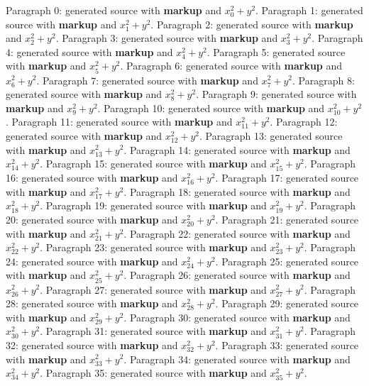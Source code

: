 \documentclass{article}
\begin{document}
Paragraph 0: generated source with \textbf{markup} and $x_{0}^2 + y^2$.
Paragraph 1: generated source with \textbf{markup} and $x_{1}^2 + y^2$.
Paragraph 2: generated source with \textbf{markup} and $x_{2}^2 + y^2$.
Paragraph 3: generated source with \textbf{markup} and $x_{3}^2 + y^2$.
Paragraph 4: generated source with \textbf{markup} and $x_{4}^2 + y^2$.
Paragraph 5: generated source with \textbf{markup} and $x_{5}^2 + y^2$.
Paragraph 6: generated source with \textbf{markup} and $x_{6}^2 + y^2$.
Paragraph 7: generated source with \textbf{markup} and $x_{7}^2 + y^2$.
Paragraph 8: generated source with \textbf{markup} and $x_{8}^2 + y^2$.
Paragraph 9: generated source with \textbf{markup} and $x_{9}^2 + y^2$.
Paragraph 10: generated source with \textbf{markup} and $x_{10}^2 + y^2$.
Paragraph 11: generated source with \textbf{markup} and $x_{11}^2 + y^2$.
Paragraph 12: generated source with \textbf{markup} and $x_{12}^2 + y^2$.
Paragraph 13: generated source with \textbf{markup} and $x_{13}^2 + y^2$.
Paragraph 14: generated source with \textbf{markup} and $x_{14}^2 + y^2$.
Paragraph 15: generated source with \textbf{markup} and $x_{15}^2 + y^2$.
Paragraph 16: generated source with \textbf{markup} and $x_{16}^2 + y^2$.
Paragraph 17: generated source with \textbf{markup} and $x_{17}^2 + y^2$.
Paragraph 18: generated source with \textbf{markup} and $x_{18}^2 + y^2$.
Paragraph 19: generated source with \textbf{markup} and $x_{19}^2 + y^2$.
Paragraph 20: generated source with \textbf{markup} and $x_{20}^2 + y^2$.
Paragraph 21: generated source with \textbf{markup} and $x_{21}^2 + y^2$.
Paragraph 22: generated source with \textbf{markup} and $x_{22}^2 + y^2$.
Paragraph 23: generated source with \textbf{markup} and $x_{23}^2 + y^2$.
Paragraph 24: generated source with \textbf{markup} and $x_{24}^2 + y^2$.
Paragraph 25: generated source with \textbf{markup} and $x_{25}^2 + y^2$.
Paragraph 26: generated source with \textbf{markup} and $x_{26}^2 + y^2$.
Paragraph 27: generated source with \textbf{markup} and $x_{27}^2 + y^2$.
Paragraph 28: generated source with \textbf{markup} and $x_{28}^2 + y^2$.
Paragraph 29: generated source with \textbf{markup} and $x_{29}^2 + y^2$.
Paragraph 30: generated source with \textbf{markup} and $x_{30}^2 + y^2$.
Paragraph 31: generated source with \textbf{markup} and $x_{31}^2 + y^2$.
Paragraph 32: generated source with \textbf{markup} and $x_{32}^2 + y^2$.
Paragraph 33: generated source with \textbf{markup} and $x_{33}^2 + y^2$.
Paragraph 34: generated source with \textbf{markup} and $x_{34}^2 + y^2$.
Paragraph 35: generated source with \textbf{markup} and $x_{35}^2 + y^2$.
\end{document}
